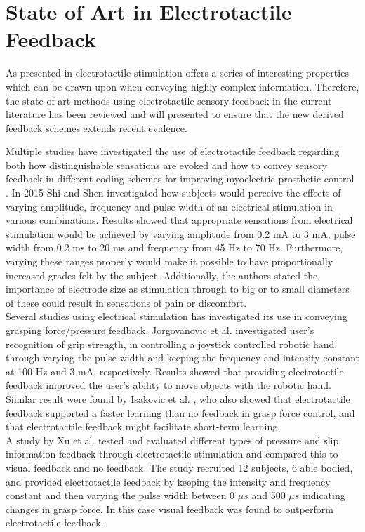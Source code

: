 \section{State of Art in Electrotactile Feedback}

As presented in  electrotactile stimulation offers a series of interesting properties which can be drawn upon when conveying highly complex information. Therefore, the state of art methods using electrotactile sensory feedback in the current literature has been reviewed and will presented to ensure that the new derived feedback schemes extends recent evidence. 

Multiple studies have investigated the use of electrotactile feedback regarding both how distinguishable sensations are evoked and how to convey sensory feedback in different coding schemes for improving myoelectric prosthetic control \cite{Stephens-Fripp2018}. 
In 2015 Shi and Shen \cite{Shi2015} investigated how subjects would perceive the effects of varying amplitude, frequency and pulse width of an electrical stimulation in various combinations. Results showed that appropriate sensations from electrical stimulation would be achieved by varying amplitude from 0.2 mA to 3 mA, pulse width from 0.2 ms to 20 ms and frequency from 45 Hz to 70 Hz. Furthermore, varying these ranges properly would make it possible to have proportionally increased grades felt by the subject. Additionally, the authors stated the importance of electrode size as stimulation through to big or to small diameters of these could result in sensations of pain or discomfort. \cite{Shi2015} \\         
Several studies \cite{Jorgovanovic2014,Isakovic2016,Xu2016,Pamungkas2015} using electrical stimulation has investigated its use in conveying grasping force/pressure feedback. Jorgovanovic et al.\cite{Jorgovanovic2014} investigated user's recognition of grip strength, in controlling a joystick controlled robotic hand, through varying the pulse width and keeping the frequency and intensity constant at 100 Hz and 3 mA, respectively. Results showed that providing electrotactile feedback improved the user's ability to move objects with the robotic hand. \cite{Jorgovanovic2014} Similar result were found by Isakovic et al. \cite{Isakovic2016}, who also showed that electrotactile feedback supported a faster learning than no feedback in grasp force control, and that electrotactile feedback might facilitate short-term learning. \\ 
A study by Xu et al. \cite{Xu2016} tested and evaluated different types of pressure and slip information feedback through electrotactile stimulation and compared this to visual feedback and no feedback. The study recruited 12 subjects, 6 able bodied, and provided electrotactile feedback by keeping the intensity and frequency constant and then varying the pulse width between 0 $\mu s$ and 500 $\mu s$ indicating changes in grasp force. In this case visual feedback was found to outperform electrotactile feedback. \cite{Xu2016} \\
